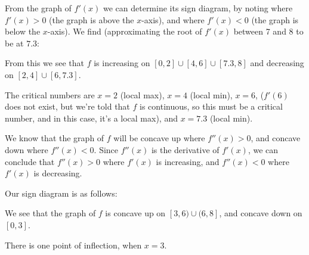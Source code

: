 \documentclass[12pt]{article}
\begin{document}
\begin{enumerate}
From the graph of $f'(x)$ we can determine its sign diagram, by noting where $f'(x)>0$ (the graph is above the $x$-axis), and where $f'(x)<0$ (the graph is below the $x$-axis). We find (approximating the root of $f'(x)$ between 7 and 8 to be at $7.3$:
\begin{center}
\end{center}
From this we see that $f$ is increasing on $[0,2]\cup [4,6]\cup [7.3,8]$ and decreasing on $[2,4]\cup [6,7.3]$. 

The critical numbers are $x=2$ (local max), $x=4$ (local min), $x=6$, ($f'(6)$ does not exist, but we're told that $f$ is continuous, so this must be a critical number, and in this case, it's a local max), and $x=7.3$ (local min). 

We know that the graph of $f$ will be concave up where $f''(x)>0$, and concave down where $f''(x)<0$. Since $f''(x)$ is the derivative of $f'(x)$, we can conclude that $f''(x)>0$ where $f'(x)$ is increasing, and $f''(x)<0$ where $f'(x)$ is decreasing. 

Our sign diagram is as follows:
\begin{center}
\end{center}
We see that the graph of $f$ is concave up on $[3,6)\cup (6,8]$, and concave down on $[0,3]$. 

There is one point of inflection, when $x=3$.


\end{enumerate}
\end{document}
